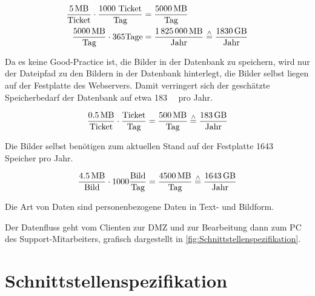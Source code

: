 \documentclass[a4paper,
    11pt,
    headings=small,
    ngerman,
    listof=totoc,
    numbers=noenddot]{scrreprt}[2021/11/13]
\begin{document}
\begin{align*}
  \frac{\SI{5}{\mega\byte}}{\text{Ticket}} \cdot \frac{1000\text{ Ticket}}{\text{Tag}} & = \frac{\SI{5000}{\mega\byte}}{\text{Tag}}                                                                  \\
  \frac{\SI{5000}{\mega\byte}}{\text{Tag}} \cdot 365 \text{Tage}                       & = \frac{\SI{1825000}{\mega\byte}}{\text{Jahr}} \stackrel{\wedge}= \frac{\SI{1830}{\giga\byte}}{\text{Jahr}}
\end{align*}


Da es keine Good-Practice ist, die Bilder in der Datenbank zu speichern, wird nur der Dateipfad zu den Bildern in der Datenbank hinterlegt, die Bilder selbst liegen auf der Festplatte des Webservers. Damit verringert sich der geschätzte Speicherbedarf der Datenbank auf etwa \SI{183}{\giga\byte} pro Jahr.

\begin{align*}
  \frac{\SI{0.5}{\mega\byte}}{\text{Ticket}} \cdot \frac{\text{Ticket}}{\text{Tag}} = \frac{\SI{500}{\mega\byte}}{\text{Tag}} \stackrel{\wedge}= \frac{\SI{183}{\giga\byte}}{\text{Jahr}}
\end{align*}

Die Bilder selbst benötigen zum aktuellen Stand auf der Festplatte \SI{1643}{\giga\byte} Speicher pro Jahr.

\begin{align*}
  \frac{\SI{4.5}{\mega\byte}}{\text{Bild}} \cdot 1000 \frac{\text{Bild}}{\text{Tag}} = \frac{\SI{4500}{\mega\byte}}{\text{Tag}} \stackrel{\wedge}= \frac{\SI{1643}{\giga\byte}}{\text{Jahr}}
\end{align*}

Die Art von Daten sind personenbezogene Daten in Text- und Bildform.

Der Datenfluss geht vom Clienten zur \ac{DMZ} und zur Bearbeitung dann zum PC des Support-Mitarbeiters, grafisch dargestellt in \vref{fig:Schnittstellenspezifikation}.


\newpage
\section{Schnittstellenspezifikation}
\end{document}
